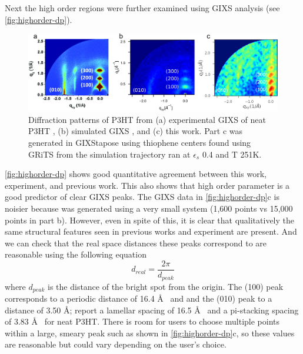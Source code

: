 Next the high order regions were further examined using GIXS analysis (see \autoref{fig:highorder-dp}).
\begin{figure}
    \centering
    \includegraphics[width=0.8\linewidth]{figures/p3ht_val/Miller2018_fig6comparison.png}
    \caption{Diffraction patterns of P3HT from (a) experimental GIXS of neat P3HT \cite{Ko2012}, (b) simulated GIXS \citep{Miller2018}, and (c) this work. Part c was generated in GIXStapose using thiophene centers found using GRiTS from the simulation trajectory ran at $\epsilon_{s}$ 0.4 and T 251K.}\label{fig:highorder-dp}
\end{figure}
\autoref{fig:highorder-dp} shows good quantitative agreement between this work, experiment, and previous work. This also shows that high order parameter is a good predictor of clear GIXS peaks.
The GIXS data in \autoref{fig:highorder-dp}c is noisier because was generated using a very small system (1,600 points vs 15,000 points in part b). However, even in spite of this, it is clear that qualitatively the same structural features seen in previous works and experiment are present. 
And we can check that the real space distances these peaks correspond to are reasonable using the following equation
\begin{equation}\label{eq:peaks_to_dspace}
    d_{real} = \frac{2 \pi}{d_{peak}}
\end{equation}
where $d_{peak}$ is the distance of the bright spot from the origin.
The (100) peak corresponds to a periodic distance of 16.4 \AA~ and and the (010) peak to a distance of 3.50 \AA; \citet{Duong2013} report a lamellar spacing of 16.5 \AA~ and a pi-stacking spacing of 3.83 \AA~ for neat P3HT. 
There is room for users to choose multiple points within a large, smeary peak such as shown in \autoref{fig:highorder-dp}c, so these values are reasonable but could vary depending on the user's choice.


